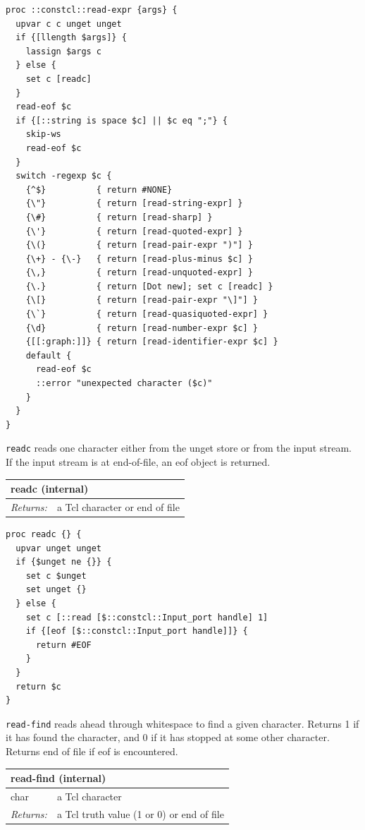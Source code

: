 \documentclass[twoside,9pt]{report}
\begin{document}
\noindent\makebox[\linewidth]{\rule{\linewidth}{0.4pt}}
\begin{lstlisting}
proc ::constcl::read-expr {args} {
  upvar c c unget unget
  if {[llength $args]} {
    lassign $args c
  } else {
    set c [readc]
  }
  read-eof $c
  if {[::string is space $c] || $c eq ";"} {
    skip-ws
    read-eof $c
  }
  switch -regexp $c {
    {^$}          { return #NONE}
    {\"}          { return [read-string-expr] }
    {\#}          { return [read-sharp] }
    {\'}          { return [read-quoted-expr] }
    {\(}          { return [read-pair-expr ")"] }
    {\+} - {\-}   { return [read-plus-minus $c] }
    {\,}          { return [read-unquoted-expr] }
    {\.}          { return [Dot new]; set c [readc] }
    {\[}          { return [read-pair-expr "\]"] }
    {\`}          { return [read-quasiquoted-expr] }
    {\d}          { return [read-number-expr $c] }
    {[[:graph:]]} { return [read-identifier-expr $c] }
    default {
      read-eof $c
      ::error "unexpected character ($c)"
    }
  }
}
\end{lstlisting}
\noindent\makebox[\linewidth]{\rule{\linewidth}{0.4pt}}

\texttt{readc} reads one character either from the unget store or from the input stream. If the input stream is at end-of-file, an eof object is returned.

\begin{tabular}{ |l l| }
\hline
\multicolumn{2}{|l|}{readc (internal)} \\
\hline
\textit{Returns:} & a Tcl character or end of file \\
\hline
\end{tabular}

\noindent\makebox[\linewidth]{\rule{\linewidth}{0.4pt}}
\begin{lstlisting}
proc readc {} {
  upvar unget unget
  if {$unget ne {}} {
    set c $unget
    set unget {}
  } else {
    set c [::read [$::constcl::Input_port handle] 1]
    if {[eof [$::constcl::Input_port handle]]} {
      return #EOF
    }
  }
  return $c
}
\end{lstlisting}
\noindent\makebox[\linewidth]{\rule{\linewidth}{0.4pt}}

\texttt{read-find} reads ahead through whitespace to find a given character. Returns 1 if it has found the character, and 0 if it has stopped at some other character. Returns end of file if eof is encountered.

\begin{tabular}{ |l l| }
\hline
\multicolumn{2}{|l|}{read-find (internal)} \\
\hline
char & a Tcl character \\
\textit{Returns:} & a Tcl truth value (1 or 0) or end of file \\
\hline
\end{tabular}
\end{document}
